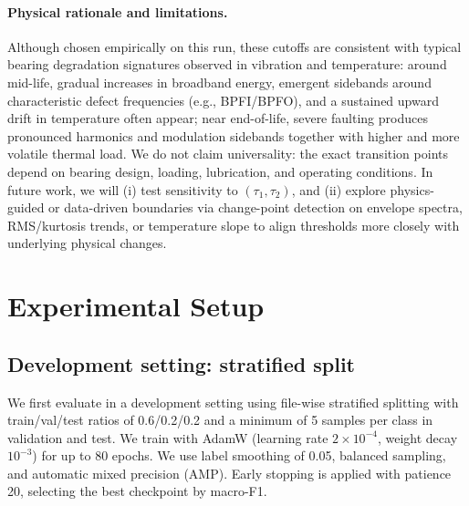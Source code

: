 \documentclass{article}
\begin{document}
\paragraph{Physical rationale and limitations.} Although chosen empirically on this run, these cutoffs are consistent with typical bearing degradation signatures observed in vibration and temperature: around mid-life, gradual increases in broadband energy, emergent sidebands around characteristic defect frequencies (e.g., BPFI/BPFO), and a sustained upward drift in temperature often appear; near end-of-life, severe faulting produces pronounced harmonics and modulation sidebands together with higher and more volatile thermal load. We do not claim universality: the exact transition points depend on bearing design, loading, lubrication, and operating conditions. In future work, we will (i) test sensitivity to $(\tau_1,\tau_2)$, and (ii) explore physics-guided or data-driven boundaries via change-point detection on envelope spectra, RMS/kurtosis trends, or temperature slope to align thresholds more closely with underlying physical changes.

\section{Experimental Setup}
\label{sec:setup}

\subsection{Development setting: stratified split}
We first evaluate in a development setting using file-wise stratified splitting with train/val/test ratios of 0.6/0.2/0.2 and a minimum of 5 samples per class in validation and test. 
We train with AdamW (learning rate $2\times10^{-4}$, weight decay $10^{-3}$) for up to 80 epochs. 
We use label smoothing of 0.05, balanced sampling, and automatic mixed precision (AMP). 
Early stopping is applied with patience 20, selecting the best checkpoint by macro-F1.
\end{document}
